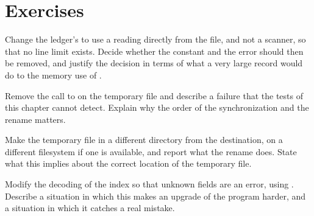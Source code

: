\section*{Exercises}

\begin{exercise}
Change the ledger's  to use a  reading directly from the file, and not a scanner, so that no line limit exists. Decide whether the constant  and the error  should then be removed, and justify the decision in terms of what a very large record would do to the memory use of .
\end{exercise}

\begin{exercise}
Remove the call to  on the temporary file and describe a failure that the tests of this chapter cannot detect. Explain why the order of the synchronization and the rename matters.
\end{exercise}

\begin{exercise}
Make the temporary file in a different directory from the destination, on a different filesystem if one is available, and report what the rename does. State what this implies about the correct location of the temporary file.
\end{exercise}

\begin{exercise}
Modify the decoding of the index so that unknown fields are an error, using . Describe a situation in which this makes an upgrade of the program harder, and a situation in which it catches a real mistake.
\end{exercise}
